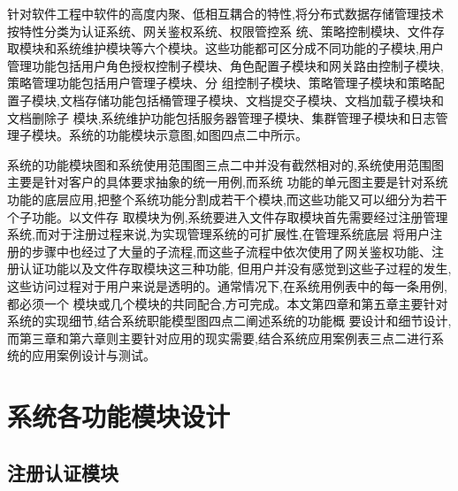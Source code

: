 
针对软件工程中软件的高度内聚、低相互耦合的特性,将分布式数据存储管理技术按特性分类为认证系统、网关鉴权系统、权限管控系
统、策略控制模块、文件存取模块和系统维护模块等六个模块。这些功能都可区分成不同功能的子模块,用户管理功能包括用户角色授权控制子模块、角色配置子模块和网关路由控制子模块,策略管理功能包括用户管理子模块、分
组控制子模块、策略管理子模块和策略配置子模块,文档存储功能包括桶管理子模块、文档提交子模块、文档加载子模块和文档删除子
模块,系统维护功能包括服务器管理子模块、集群管理子模块和日志管理子模块。系统的功能模块示意图,如图四点二中所示。

系统的功能模块图和系统使用范围图三点二中并没有截然相对的,系统使用范围图主要是针对客户的具体要求抽象的统一用例,而系统
功能的单元图主要是针对系统功能的底层应用,把整个系统功能分割成若干个模块,而这些功能又可以细分为若干个子功能。以文件存
取模块为例,系统要进入文件存取模块首先需要经过注册管理系统,而对于注册过程来说,为实现管理系统的可扩展性,在管理系统底层
将用户注册的步骤中也经过了大量的子流程,而这些子流程中依次使用了网关鉴权功能、注册认证功能以及文件存取模块这三种功能,
但用户并没有感觉到这些子过程的发生,这些访问过程对于用户来说是透明的。通常情况下,在系统用例表中的每一条用例,都必须一个
模块或几个模块的共同配合,方可完成。本文第四章和第五章主要针对系统的实现细节,结合系统职能模型图四点二阐述系统的功能概
要设计和细节设计,而第三章和第六章则主要针对应用的现实需要,结合系统应用案例表三点二进行系统的应用案例设计与测试。

\section{系统各功能模块设计}

\subsection{注册认证模块}

